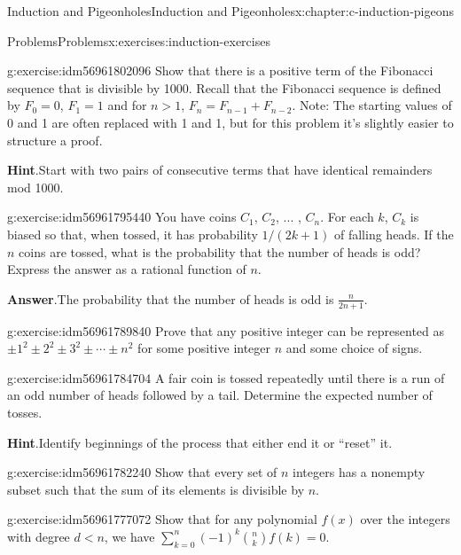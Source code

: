 \documentclass[twoside,10pt,]{book}
\newcommand{\blocktitlefont}{\relax}
\numberwithin{equation}{section}
\newcommand{\lt}{<}
\begin{document}
\begin{chapterptx}{Induction and Pigeonholes}{}{Induction and Pigeonholes}{}{}{x:chapter:c-induction-pigeons}
\begin{exercises-section}{Problems}{}{Problems}{}{}{x:exercises:induction-exercises}
\begin{divisionexercise}{9}{}{}{g:exercise:idm56961802096}
Show that there is a positive term of the Fibonacci sequence that is divisible by 1000. Recall that the Fibonacci sequence is defined by \(F_0=0\), \(F_1= 1\) and for \(n>1\), \(F_n= F_{n-1}+F_{n-2}\). Note: The starting values of 0 and 1 are often replaced with 1 and 1, but for this problem it's slightly easier to structure a proof.%
\par\smallskip%
\noindent\textbf{\blocktitlefont Hint}.\hypertarget{g:hint:idm56961795824}{}\quad{}Start with two pairs of consecutive terms that have identical remainders mod 1000.%
\end{divisionexercise}%
\begin{divisionexercise}{10}{}{}{g:exercise:idm56961795440}%
You have coins \(C_1\), \(C_2\), ... , \(C_n\). For each \(k\), \(C_k\) is biased so that, when tossed, it has probability \(1/(2k + 1)\) of falling heads. If the \(n\) coins are tossed, what is the probability that the number of heads is odd? Express the answer as a rational function of \(n\).%
\par\smallskip%
\noindent\textbf{\blocktitlefont Answer}.\hypertarget{g:answer:idm56961794288}{}\quad{}The probability that the number of heads is odd is \(\frac{n}{2n+1}.\)%
\end{divisionexercise}%
\begin{divisionexercise}{11}{}{}{g:exercise:idm56961789840}%
Prove that any positive integer can be represented as \(\pm 1^2\pm 2^2\pm 3^2\pm \cdots \pm n^2\) for some positive integer \(n\) and some choice of signs.%
\end{divisionexercise}%
\begin{divisionexercise}{12}{}{}{g:exercise:idm56961784704}%
A fair coin is tossed repeatedly until there is a run of an odd number of heads followed by a tail. Determine the expected number of tosses.%
\par\smallskip%
\noindent\textbf{\blocktitlefont Hint}.\hypertarget{g:hint:idm56961783376}{}\quad{}Identify beginnings of the process that either end it or ``reset'' it.%
\end{divisionexercise}%
\begin{divisionexercise}{13}{}{}{g:exercise:idm56961782240}%
Show that every set of \(n\) integers has a nonempty subset such that the sum of its elements is divisible by \(n\).%
\end{divisionexercise}%
\begin{divisionexercise}{14}{}{}{g:exercise:idm56961777072}%
Show that for any polynomial \(f(x)\) over the integers with degree \(d\lt n\), we have \(\sum_{k=0}^{n} (-1)^k \binom{n}{k} f(k) = 0\).%

\end{divisionexercise}
\end{exercises-section}
\end{chapterptx}
\end{document}
